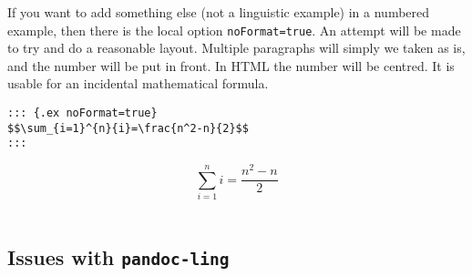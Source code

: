 \documentclass[
]{article}
\begin{document}
If you want to add something else (not a linguistic example) in a
numbered example, then there is the local option \texttt{noFormat=true}.
An attempt will be made to try and do a reasonable layout. Multiple
paragraphs will simply we taken as is, and the number will be put in
front. In HTML the number will be centred. It is usable for an
incidental mathematical formula.

\begin{verbatim}
::: {.ex noFormat=true}
$$\sum_{i=1}^{n}{i}=\frac{n^2-n}{2}$$
:::
\end{verbatim}

\begin{samepage}
  \[\sum_{i=1}^{n}{i}=\frac{n^2-n}{2}\]\\
  
\xe
\end{samepage}

\subsection{\texorpdfstring{Issues with
\texttt{pandoc-ling}}{Issues with pandoc-ling}}\label{issues-with-pandoc-ling}
\end{document}
